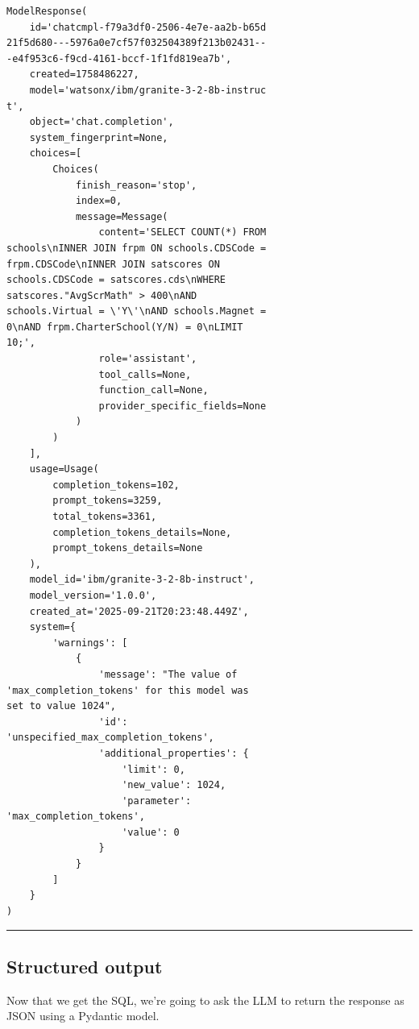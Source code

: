 \documentclass[
  letterpaper,
  DIV=11,
  numbers=noendperiod]{scrartcl}
\begin{document}
\begin{verbatim}
ModelResponse(
    id='chatcmpl-f79a3df0-2506-4e7e-aa2b-b65d
21f5d680---5976a0e7cf57f032504389f213b02431--
-e4f953c6-f9cd-4161-bccf-1f1fd819ea7b',
    created=1758486227,
    model='watsonx/ibm/granite-3-2-8b-instruc
t',
    object='chat.completion',
    system_fingerprint=None,
    choices=[
        Choices(
            finish_reason='stop',
            index=0,
            message=Message(
                content='SELECT COUNT(*) FROM
schools\nINNER JOIN frpm ON schools.CDSCode =
frpm.CDSCode\nINNER JOIN satscores ON 
schools.CDSCode = satscores.cds\nWHERE 
satscores."AvgScrMath" > 400\nAND 
schools.Virtual = \'Y\'\nAND schools.Magnet =
0\nAND frpm.CharterSchool(Y/N) = 0\nLIMIT 
10;',
                role='assistant',
                tool_calls=None,
                function_call=None,
                provider_specific_fields=None
            )
        )
    ],
    usage=Usage(
        completion_tokens=102,
        prompt_tokens=3259,
        total_tokens=3361,
        completion_tokens_details=None,
        prompt_tokens_details=None
    ),
    model_id='ibm/granite-3-2-8b-instruct',
    model_version='1.0.0',
    created_at='2025-09-21T20:23:48.449Z',
    system={
        'warnings': [
            {
                'message': "The value of 
'max_completion_tokens' for this model was 
set to value 1024",
                'id': 
'unspecified_max_completion_tokens',
                'additional_properties': {
                    'limit': 0,
                    'new_value': 1024,
                    'parameter': 
'max_completion_tokens',
                    'value': 0
                }
            }
        ]
    }
)
\end{verbatim}

\begin{center}\rule{0.5\linewidth}{0.5pt}\end{center}

\subsection{Structured output}\label{structured-output}

Now that we get the SQL, we're going to ask the LLM to return the
response as JSON using a Pydantic model.
\end{document}
